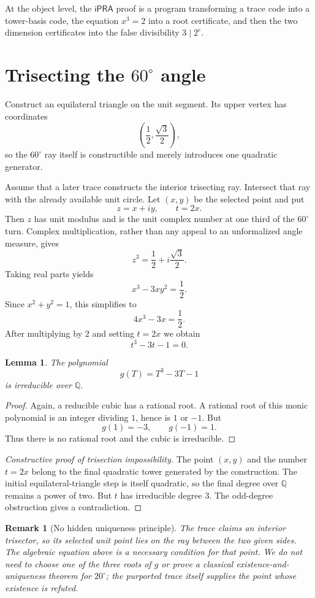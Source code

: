 \documentclass[11pt]{article}
\newtheorem{lemma}[theorem]{Lemma}
\newtheorem{remark}[theorem]{Remark}
\newcommand{\Q}{\mathbb{Q}}
\newcommand{\ipra}{\mathsf{iPRA}}
\begin{document}
At the object level, the $\ipra$ proof is a program transforming a trace code into a tower-basis code, the equation $x^3=2$ into a root certificate, and then the two dimension certificates into the false divisibility $3\mid2^e$.

\section{Trisecting the $60^\circ$ angle}

Construct an equilateral triangle on the unit segment.  Its upper vertex has coordinates
\[
  \left(\frac12,\frac{\sqrt3}{2}\right),
\]
so the $60^\circ$ ray itself is constructible and merely introduces one quadratic generator.

Assume that a later trace constructs the interior trisecting ray.  Intersect that ray with the already available unit circle.  Let $(x,y)$ be the selected point and put
\[
  z=x+iy,\qquad t=2x.
\]
Then $z$ has unit modulus and is the unit complex number at one third of the $60^\circ$ turn.  Complex multiplication, rather than any appeal to an unformalized angle measure, gives
\[
  z^3=\frac12+i\frac{\sqrt3}{2}.
\]
Taking real parts yields
\[
  x^3-3xy^2=\frac12.
\]
Since $x^2+y^2=1$, this simplifies to
\[
  4x^3-3x=\frac12.
\]
After multiplying by $2$ and setting $t=2x$ we obtain
\[
  t^3-3t-1=0.
\]

\begin{lemma}
The polynomial
\[
  g(T)=T^3-3T-1
\]
is irreducible over $\Q$.
\end{lemma}

\begin{proof}
Again, a reducible cubic has a rational root.  A rational root of this monic polynomial is an integer dividing $1$, hence is $1$ or $-1$.  But
\[
  g(1)=-3,\qquad g(-1)=1.
\]
Thus there is no rational root and the cubic is irreducible.
\end{proof}

\begin{proof}[Constructive proof of trisection impossibility]
The point $(x,y)$ and the number $t=2x$ belong to the final quadratic tower generated by the construction.  The initial equilateral-triangle step is itself quadratic, so the final degree over $\Q$ remains a power of two.  But $t$ has irreducible degree $3$.  The odd-degree obstruction gives a contradiction.
\end{proof}

\begin{remark}[No hidden uniqueness principle]
The trace claims an \emph{interior} trisector, so its selected unit point lies on the ray between the two given sides.  The algebraic equation above is a necessary condition for that point.  We do not need to choose one of the three roots of $g$ or prove a classical existence-and-uniqueness theorem for $20^\circ$; the purported trace itself supplies the point whose existence is refuted.
\end{remark}
\end{document}
